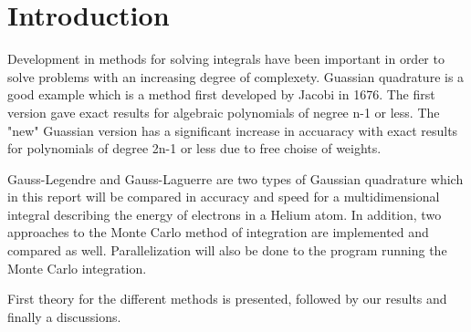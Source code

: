 \documentclass[../main.tex]{subfiles}
\begin{document}
\section{Introduction} \label{sec:intro}
Development in methods for solving integrals have been important in order to solve problems with an increasing degree of complexety. Guassian quadrature is a good example which is a method first developed by Jacobi in 1676. The first version gave exact results for algebraic polynomials of negree n-1 or less. The "new" Guassian version has a significant increase in accuaracy with exact results for polynomials of degree 2n-1 or less due to free choise of weights. \cite{Milovanovic2016}

Gauss-Legendre and Gauss-Laguerre are two types of Gaussian quadrature which in this report will be compared in accuracy and speed for a multidimensional integral describing the energy of electrons in a Helium atom. In addition, two approaches to the Monte Carlo method of integration are implemented and compared as well. Parallelization will also be done to the program running the Monte Carlo integration.

First theory for the different methods is  presented, followed by our results and finally a discussions.
\end{document}

